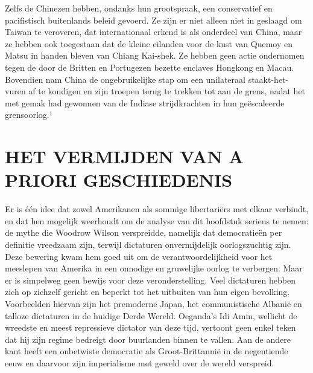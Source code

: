 \documentclass[
  a5paper,
  smalldemyvopaper,10pt,twoside,onecolumn,openright,extrafontsizes,hidelinks]{memoir}
\begin{document}
Zelfs de Chinezen hebben, ondanks hun grootspraak, een conservatief en
pacifistisch buitenlands beleid gevoerd. Ze zijn er niet alleen niet in
geslaagd om Taiwan te veroveren, dat internationaal erkend is als
onderdeel van China, maar ze hebben ook toegestaan dat de kleine
eilanden voor de kust van Quemoy en Matsu in handen bleven van Chiang
Kai-shek. Ze hebben geen actie ondernomen tegen de door de Britten en
Portugezen bezette enclaves Hongkong en Macau. Bovendien nam China de
ongebruikelijke stap om een unilateraal staakt-het-vuren af te kondigen
en zijn troepen terug te trekken tot aan de grens, nadat het met gemak
had gewonnen van de Indiase strijdkrachten in hun geëscaleerde
grensoorlog.¹

\section{HET VERMIJDEN VAN A PRIORI
GESCHIEDENIS}\label{het-vermijden-van-a-priori-geschiedenis}

Er is één idee dat zowel Amerikanen als sommige libertariërs met elkaar
verbindt, en dat hen mogelijk weerhoudt om de analyse van dit hoofdstuk
serieus te nemen: de mythe die Woodrow Wilson verspreidde, namelijk dat
democratieën per definitie vreedzaam zijn, terwijl dictaturen
onvermijdelijk oorlogszuchtig zijn. Deze bewering kwam hem goed uit om
de verantwoordelijkheid voor het meeslepen van Amerika in een onnodige
en gruwelijke oorlog te verbergen. Maar er is simpelweg geen bewijs voor
deze veronderstelling. Veel dictaturen hebben zich op zichzelf gericht
en beperkt tot het uitbuiten van hun eigen bevolking. Voorbeelden
hiervan zijn het premoderne Japan, het communistische Albanië en talloze
dictaturen in de huidige Derde Wereld. Oeganda's Idi Amin, wellicht de
wreedste en meest repressieve dictator van deze tijd, vertoont geen
enkel teken dat hij zijn regime bedreigt door buurlanden binnen te
vallen. Aan de andere kant heeft een onbetwiste democratie als
Groot-Brittannië in de negentiende eeuw en daarvoor zijn imperialisme
met geweld over de wereld verspreid.
\end{document}
